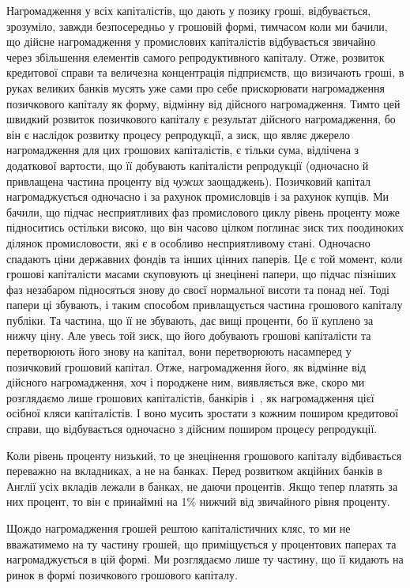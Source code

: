 
Нагромадження у всіх капіталістів, що дають у позику гроші, відбувається,
зрозуміло, завжди безпосередньо у грошовій формі, тимчасом коли ми бачили, що
дійсне нагромадження у промислових капіталістів відбувається звичайно через
збільшення елементів самого репродуктивного капіталу. Отже, розвиток кредитової
справи та величезна концентрація підприємств, що визичають гроші, в руках
великих банків мусять уже сами про себе прискорювати нагромадження позичкового
капіталу як форму, відмінну від дійсного нагромадження. Тимто цей
швидкий розвиток позичкового капіталу є результат дійсного нагромадження,
бо він є наслідок розвитку процесу репродукції, а зиск, що являє джерело нагромадження
для цих грошових капіталістів, є тільки сума, відлічена з додаткової
вартости, що її добувають капіталісти репродукції (одночасно й привлащена
частина проценту від \emph{чужих} заощаджень). Позичковий капітал нагромаджується
одночасно і за рахунок промисловців і за рахунок купців. Ми бачили, що
підчас несприятливих фаз промислового циклу рівень проценту може підноситись
остільки високо, що він часово цілком поглинає зиск тих поодиноких ділянок
промисловости, які є в особливо несприятливому стані. Одночасно спадають ціни
державних фондів та інших цінних паперів. Це є той момент, коли грошові
капіталісти масами скуповують ці знецінені папери, що підчас пізніших фаз
незабаром підносяться знову до своєї нормальної висоти та понад неї. Тоді
папери ці збувають, і таким способом привлащується частина грошового капіталу
публіки. Та частина, що її не збувають, дає вищі проценти, бо її куплено
за нижчу ціну. Але увесь той зиск, що його добувають грошові капіталісти та
перетворюють його знову на капітал, вони перетворюють насамперед у позичковий
грошовий капітал. Отже, нагромадження його, як відмінне від дійсного нагромадження,
хоч і породжене ним, виявляється вже, скоро ми розглядаємо лише грошових
капіталістів, банкірів і~, як нагромадження цієї осібної кляси капіталістів.
І воно мусить зростати з кожним поширом кредитової справи, що відбувається
одночасно з дійсним поширом процесу репродукції.

Коли рівень проценту низький, то це знецінення грошового капіталу відбивається
переважно на вкладниках, а не на банках. Перед розвитком акційних
банків в Англії  усіх вкладів лежали в банках, не даючи процентів. Якщо тепер
платять за них процент, то він є принаймні на 1\% нижчий від звичайного
рівня проценту.

Щождо нагромадження грошей рештою капіталістичних кляс, то ми не
вважатимемо на ту частину грошей, що приміщується у процентових паперах
та нагромаджується в цій формі. Ми розглядаємо лише ту частину, що її кидають
на ринок в формі позичкового грошового капіталу.

